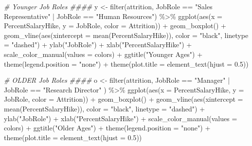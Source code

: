 \documentclass[
]{article}
\newenvironment{Shaded}{\begin{snugshade}}{\end{snugshade}}
\newcommand{\AttributeTok}[1]{\textcolor[rgb]{0.77,0.63,0.00}{#1}}
\newcommand{\CommentTok}[1]{\textcolor[rgb]{0.56,0.35,0.01}{\textit{#1}}}
\newcommand{\FloatTok}[1]{\textcolor[rgb]{0.00,0.00,0.81}{#1}}
\newcommand{\FunctionTok}[1]{\textcolor[rgb]{0.00,0.00,0.00}{#1}}
\newcommand{\NormalTok}[1]{#1}
\newcommand{\OtherTok}[1]{\textcolor[rgb]{0.56,0.35,0.01}{#1}}
\newcommand{\SpecialCharTok}[1]{\textcolor[rgb]{0.00,0.00,0.00}{#1}}
\newcommand{\StringTok}[1]{\textcolor[rgb]{0.31,0.60,0.02}{#1}}
\begin{document}
\begin{Shaded}
\begin{Highlighting}[]
\CommentTok{\# Younger Job Roles \#\#\#\#}
\NormalTok{y }\OtherTok{\textless{}{-}} \FunctionTok{filter}\NormalTok{(attrition, JobRole }\SpecialCharTok{==} \StringTok{"Sales Representative"} \SpecialCharTok{|}\NormalTok{ JobRole }\SpecialCharTok{==} \StringTok{"Human Resources"}\NormalTok{) }\SpecialCharTok{\%\textgreater{}\%}
  \FunctionTok{ggplot}\NormalTok{(}\FunctionTok{aes}\NormalTok{(}\AttributeTok{x =}\NormalTok{ PercentSalaryHike, }\AttributeTok{y =}\NormalTok{ JobRole, }\AttributeTok{color =}\NormalTok{ Attrition)) }\SpecialCharTok{+}
  \FunctionTok{geom\_boxplot}\NormalTok{() }\SpecialCharTok{+}
  \FunctionTok{geom\_vline}\NormalTok{(}\FunctionTok{aes}\NormalTok{(}\AttributeTok{xintercept =} \FunctionTok{mean}\NormalTok{(PercentSalaryHike)), }\AttributeTok{color =} \StringTok{"black"}\NormalTok{, }\AttributeTok{linetype =} \StringTok{"dashed"}\NormalTok{) }\SpecialCharTok{+}
  \FunctionTok{ylab}\NormalTok{(}\StringTok{"JobRole"}\NormalTok{) }\SpecialCharTok{+}
  \FunctionTok{xlab}\NormalTok{(}\StringTok{"PercentSalaryHike"}\NormalTok{) }\SpecialCharTok{+}
  \FunctionTok{scale\_color\_manual}\NormalTok{(}\AttributeTok{values =}\NormalTok{ colors) }\SpecialCharTok{+}
  \FunctionTok{ggtitle}\NormalTok{(}\StringTok{"Younger Ages"}\NormalTok{) }\SpecialCharTok{+}
  \FunctionTok{theme}\NormalTok{(}\AttributeTok{legend.position =} \StringTok{"none"}\NormalTok{) }\SpecialCharTok{+}
  \FunctionTok{theme}\NormalTok{(}\AttributeTok{plot.title =} \FunctionTok{element\_text}\NormalTok{(}\AttributeTok{hjust =} \FloatTok{0.5}\NormalTok{)) }
  

\CommentTok{\# OLDER Job Roles \#\#\#\#}
\NormalTok{o }\OtherTok{\textless{}{-}} \FunctionTok{filter}\NormalTok{(attrition, JobRole }\SpecialCharTok{==} \StringTok{"Manager"} \SpecialCharTok{|}\NormalTok{ JobRole }\SpecialCharTok{==} \StringTok{"Research Director"}\NormalTok{ ) }\SpecialCharTok{\%\textgreater{}\%}
  \FunctionTok{ggplot}\NormalTok{(}\FunctionTok{aes}\NormalTok{(}\AttributeTok{x =}\NormalTok{ PercentSalaryHike, }\AttributeTok{y =}\NormalTok{ JobRole, }\AttributeTok{color =}\NormalTok{ Attrition)) }\SpecialCharTok{+}
  \FunctionTok{geom\_boxplot}\NormalTok{() }\SpecialCharTok{+}
  \FunctionTok{geom\_vline}\NormalTok{(}\FunctionTok{aes}\NormalTok{(}\AttributeTok{xintercept =} \FunctionTok{mean}\NormalTok{(PercentSalaryHike)), }\AttributeTok{color =} \StringTok{"black"}\NormalTok{, }\AttributeTok{linetype =} \StringTok{"dashed"}\NormalTok{) }\SpecialCharTok{+}
  \FunctionTok{ylab}\NormalTok{(}\StringTok{"JobRole"}\NormalTok{) }\SpecialCharTok{+}
  \FunctionTok{xlab}\NormalTok{(}\StringTok{"PercentSalaryHike"}\NormalTok{) }\SpecialCharTok{+}
  \FunctionTok{scale\_color\_manual}\NormalTok{(}\AttributeTok{values =}\NormalTok{ colors) }\SpecialCharTok{+}
  \FunctionTok{ggtitle}\NormalTok{(}\StringTok{"Older Ages"}\NormalTok{) }\SpecialCharTok{+}
  \FunctionTok{theme}\NormalTok{(}\AttributeTok{legend.position =} \StringTok{"none"}\NormalTok{) }\SpecialCharTok{+}
  \FunctionTok{theme}\NormalTok{(}\AttributeTok{plot.title =} \FunctionTok{element\_text}\NormalTok{(}\AttributeTok{hjust =} \FloatTok{0.5}\NormalTok{)) }



\end{Highlighting}
\end{Shaded}
\end{document}
